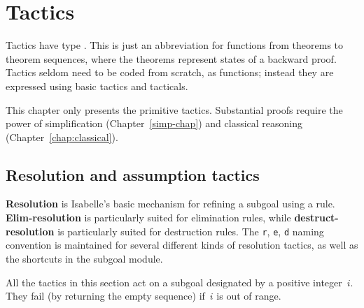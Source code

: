 \chapter{Tactics} \label{tactics}
 Tactics have type .  This is just an
abbreviation for functions from theorems to theorem sequences, where
the theorems represent states of a backward proof.  Tactics seldom
need to be coded from scratch, as functions; instead they are
expressed using basic tactics and tacticals.

This chapter only presents the primitive tactics.  Substantial proofs require
the power of simplification (Chapter~\ref{simp-chap}) and classical reasoning
(Chapter~\ref{chap:classical}).

\section{Resolution and assumption tactics}
{\bf Resolution} is Isabelle's basic mechanism for refining a subgoal using
a rule.  {\bf Elim-resolution} is particularly suited for elimination
rules, while {\bf destruct-resolution} is particularly suited for
destruction rules.  The {\tt r}, {\tt e}, {\tt d} naming convention is
maintained for several different kinds of resolution tactics, as well as
the shortcuts in the subgoal module.

All the tactics in this section act on a subgoal designated by a positive
integer~$i$.  They fail (by returning the empty sequence) if~$i$ is out of
range.

